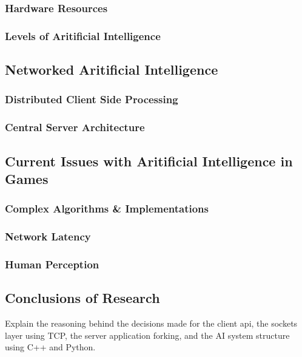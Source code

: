 \documentclass[12pt,a4paper,titlepage]{article}
\begin{document}
\subsubsection{Hardware Resources}

\subsubsection{Levels of Aritificial Intelligence}

\subsection{Networked Aritificial Intelligence}

\subsubsection{Distributed Client Side Processing}

\subsubsection{Central Server Architecture}

\subsection{Current Issues with Aritificial Intelligence in Games}

\subsubsection{Complex Algorithms \& Implementations}

\subsubsection{Network Latency}

\subsubsection{Human Perception}

\subsection{Conclusions of Research}

Explain the reasoning behind the decisions made for the client api, the sockets layer using TCP, the server application forking, and the AI system structure using C++ and Python.
\end{document}
